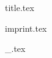 \documentclass[a4paper,10pt,twocolumn,openany]{book}
\begin{document}
\frontmatter
{title.tex}

\ifauthornotes
  {imprint.tex}
\fi


\twocolumn
\mainmatter


\setcounter{chapter}{0}



\ifauthornotes
  {_.tex}
\fi
\end{document}
